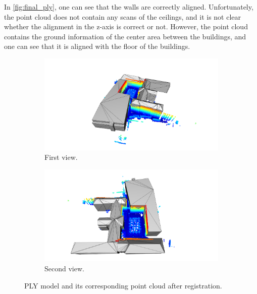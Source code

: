         In \autoref{fig:final_ply}, one can see that the walls are correctly aligned.
        Unfortunately, the point cloud does not contain any scans of the ceilings, and it is not clear whether the alignment in the z-axis is correct or not. 
        However, the point cloud contains the ground information of the center area between the buildings, 
        and one can see that it is aligned with the floor of the buildings.

        \begin{figure}[H]
            \centering
            \begin{subfigure}{1\textwidth}
                \centering
                \includegraphics[scale=0.2]{images/solution_images/final_ply_a.png}
                \caption{First view.}
                \label{fig:final_ply_a}
            \end{subfigure}
            \hfill
            \begin{subfigure}{1\textwidth}
                \centering
                \includegraphics[scale=0.2]{images/solution_images/final_ply_b.png}
                \caption{Second view.}
                \label{fig:final_ply_b}
            \end{subfigure}
            \caption{PLY model and its corresponding point cloud after registration.}
            \label{fig:final_ply}
        \end{figure}

